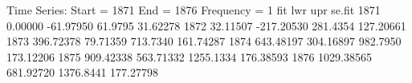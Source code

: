 \begin{Schunk}
\begin{Soutput}
Time Series:
Start = 1871 
End = 1876 
Frequency = 1 
            fit        lwr       upr    se.fit
1871    0.00000  -61.97950   61.9795  31.62278
1872   32.11507 -217.20530  281.4354 127.20661
1873  396.72378   79.71359  713.7340 161.74287
1874  643.48197  304.16897  982.7950 173.12206
1875  909.42338  563.71332 1255.1334 176.38593
1876 1029.38565  681.92720 1376.8441 177.27798
\end{Soutput}
\end{Schunk}
